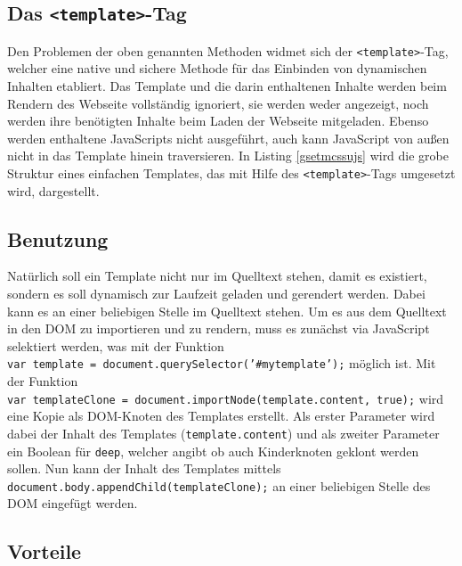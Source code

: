 \subsection{Das \texorpdfstring{\texttt{\textless{}template\textgreater{}}-Tag}{\textless{}template\textgreater{}-Tag}}\label{template-tag}

Den Problemen der oben genannten Methoden widmet sich der \texttt{\textless{}template\textgreater{}}-Tag, welcher eine native und sichere Methode für das Einbinden von dynamischen Inhalten etabliert. Das Template und die darin enthaltenen Inhalte werden beim Rendern des Webseite vollständig ignoriert, sie werden weder angezeigt, noch werden ihre benötigten Inhalte beim Laden der Webseite mitgeladen. Ebenso werden enthaltene JavaScripts nicht ausgeführt, auch kann JavaScript von außen nicht in das Template hinein traversieren. In Listing \ref{gsetmcssujs} wird die grobe Struktur eines einfachen Templates, das mit Hilfe des \texttt{\textless{}template\textgreater{}}-Tags umgesetzt wird, dargestellt.




\subsection{Benutzung}\label{benutzung}

Natürlich soll ein Template nicht nur im Quelltext stehen, damit es existiert, sondern es soll dynamisch zur Laufzeit geladen und gerendert werden. Dabei kann es an einer beliebigen Stelle im Quelltext stehen. Um es aus dem Quelltext in den \ac{DOM} zu importieren und zu rendern, muss es zunächst via JavaScript selektiert werden, was mit der Funktion \texttt{var\ template\ =\ document.querySelector('\#mytemplate');} möglich ist. Mit der Funktion \texttt{var\ templateClone\ =\ document.importNode(template.content,\ true);} wird eine Kopie als \ac{DOM}-Knoten des Templates erstellt. Als erster Parameter wird dabei der Inhalt des Templates (\texttt{template.content}) und als zweiter Parameter ein Boolean für \texttt{deep}, welcher angibt ob auch Kinderknoten geklont werden sollen. Nun kann der Inhalt des Templates mittels \texttt{document.body.appendChild(templateClone);} an einer beliebigen Stelle des \ac{DOM} eingefügt werden.


\subsection{Vorteile}\label{vorteile}

